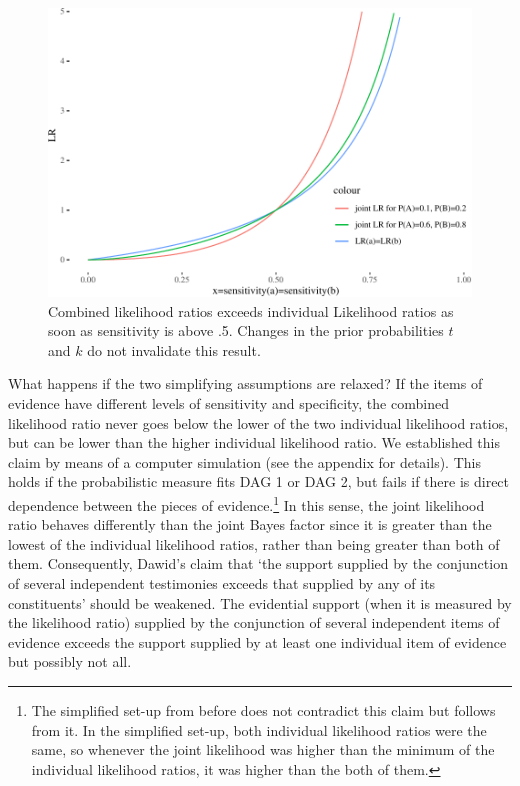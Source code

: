 \documentclass[
  10pt,
  dvipsnames,enabledeprecatedfontcommands]{scrartcl}
\begin{document}
\begin{figure}

\begin{center}\includegraphics[width=0.9\linewidth]{conjunction-paradox4_files/figure-latex/unnamed-chunk-3-1} \end{center}

\caption{Combined likelihood ratios exceeds individual Likelihood ratios as soon as sensitivity is above .5. Changes in the prior probabilities $t$ and $k$ do not invalidate this result.}
\label{fig:jointLRMarcello}
\end{figure}

What happens if the two simplifying assumptions are relaxed? If the
items of evidence have different levels of sensitivity and specificity,
the combined likelihood ratio never goes below the lower of the two
individual likelihood ratios, but can be lower than the higher
individual likelihood ratio. We established this claim by means of a
computer simulation (see the appendix for details). This holds if the
probabilistic measure fits \textsf{DAG 1} or \textsf{DAG 2}, but fails
if there is direct dependence between the pieces of evidence.\footnote{The
  simplified set-up from before does not contradict this claim but
  follows from it. In the simplified set-up, both individual likelihood
  ratios were the same, so whenever the joint likelihood was higher than
  the minimum of the individual likelihood ratios, it was higher than
  the both of them.} In this sense, the joint likelihood ratio behaves
differently than the joint Bayes factor since it is greater than the
lowest of the individual likelihood ratios, rather than being greater
than both of them. Consequently, Dawid's claim that `the support
supplied by the conjunction of several independent testimonies exceeds
that supplied by any of its constituents' should be weakened. The
evidential support (when it is measured by the likelihood ratio)
supplied by the conjunction of several independent items of evidence
exceeds the support supplied by at least one individual item of evidence
but possibly not all.
\end{document}
